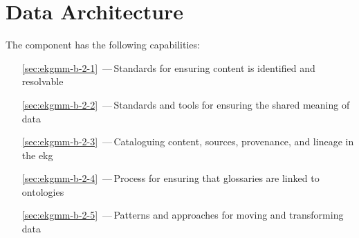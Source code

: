 \chapter{Data Architecture}\label{ch:ekg-mm-b-2} %

The  component has the following capabilities:

\begin{itemize}[leftmargin=.5in]
  \item [\ref{sec:ekgmm-b-2-1}] \,---\,Standards for ensuring content is identified and resolvable
  \item [\ref{sec:ekgmm-b-2-2}] \,---\,Standards and tools for ensuring the shared meaning of data
  \item [\ref{sec:ekgmm-b-2-3}] \,---\,Cataloguing content, sources, provenance, and lineage in the \gls{ekg}
  \item [\ref{sec:ekgmm-b-2-4}] \,---\,Process for ensuring that glossaries are linked to ontologies
  \item [\ref{sec:ekgmm-b-2-5}] \,---\,Patterns and approaches for moving and transforming data
\end{itemize}








